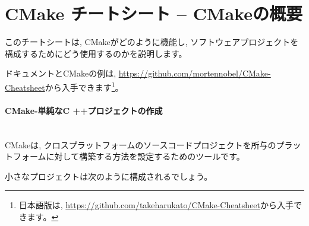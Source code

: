 \documentclass[uplatex,11pt,a4paper,landscape,dvipdfmx]{jsarticle} %
\newcommand{\sectiontitle}[1]{\paragraph{#1} \ \\} %
\begin{document}


\section*{CMake チートシート -- CMakeの概要} %



\setlength{\columnsep}{1.5cm}
\begin{multicols}{2}



  
このチートシートは, CMakeがどのように機能し, ソフトウェアプロジェクトを構成するためにどう使用するのかを説明します。
  
ドキュメントとCMakeの例は, \url{https://github.com/mortennobel/CMake-Cheatsheet}から入手できます\footnote{日本語版は, \url{https://github.com/takeharukato/CMake-Cheatsheet}から入手できます。}。
 
  \sectiontitle{CMake-単純なC ++プロジェクトの作成}
  

CMakeは, クロスプラットフォームのソースコードプロジェクトを所与のプラットフォームに対して構築する方法を設定するためのツールです。

小さなプロジェクトは次のように構成されるでしょう。

\vspace{\baselineskip} %

\noindent{}


\end{multicols}
\end{document}

